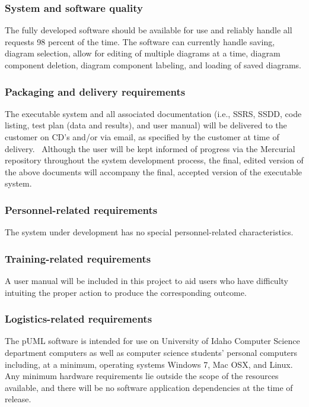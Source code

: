 \documentclass[twoside,letterpaper]{article}
\begin{document}
\subsubsection[System and software quality]{\bfseries System
and software quality}
{
The fully developed software should be available for use and reliably handle all requests 98 
percent of the time.  The software can currently handle saving, diagram selection, allow for 
editing of multiple diagrams at a time, diagram component deletion, diagram component labeling, 
and loading of saved diagrams.
}

\subsubsection[Packaging and delivery requirements]{\bfseries
Packaging and delivery requirements}
{
The executable system and all associated documentation (i.e., SSRS, SSDD, code listing, test plan (data and results), and user manual) will be delivered to the customer on CD{\textquoteright}s and/or via email, as
specified by the customer at time of delivery. \ Although the user will be kept informed of progress via the Mercurial repository throughout the
system development process, the final, edited version of the above
documents will accompany the final, accepted version of the executable
system.}

\subsubsection[Personnel{}-related requirements]{\bfseries
Personnel-related requirements}
{
The system under development has no special personnel-related
characteristics. }

\subsubsection[Training{}-related requirements]{\bfseries
Training-related requirements}
{
A user manual will be included in this project to aid users who have difficulty intuiting the proper action to produce the corresponding outcome.
}

\subsubsection[Logistics{}-related requirements]{\bfseries
Logistics-related requirements}
{
The pUML software is intended for use on University of Idaho Computer Science department computers as well as computer science students' personal computers including, at a minimum, operating systems Windows 7, Mac OSX, and Linux.
Any minimum hardware requirements lie outside the scope of the resources available,
and there will be no software application dependencies at the time of release.
}
\end{document}
